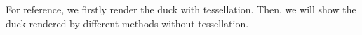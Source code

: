 \documentclass[acmtog]{acmart}
\begin{document}
For reference, we firstly render the duck with tessellation. Then, we will show the duck rendered by different methods without tessellation.
\end{document}
